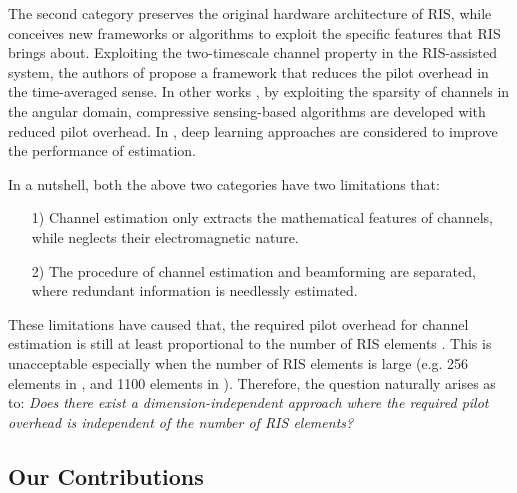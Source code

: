\documentclass[12pt,draftclsnofoot,journal,onecolumn]{IEEEtran}
\theoremstyle{nonumberplain}
\begin{document}
The second category preserves the original hardware architecture of RIS, while conceives new frameworks or algorithms to exploit the specific features that RIS brings about.
Exploiting the two-timescale channel property in the RIS-assisted system, the authors of \cite{Huchen} propose a framework that reduces the pilot overhead in the time-averaged sense.
In other works \cite{wang2020compressed,wei2021channel}, by exploiting the sparsity of channels in the angular domain, compressive sensing-based algorithms are developed with reduced pilot overhead.
In \cite{kundu2021channel}, deep learning approaches are considered to improve the performance of estimation.

In a nutshell, both the above two categories have two limitations that:
\begin{enumerate}
\item[1)]  Channel estimation only extracts the mathematical features of channels, while neglects their electromagnetic nature.
\item[2)] The procedure of channel estimation and beamforming are separated, where redundant information is needlessly estimated.
\end{enumerate}
These limitations have caused that, the required pilot overhead for channel estimation is still at least proportional to the number of RIS elements \cite{taha2021enabling,alexandropoulos2020hardware,nguyen2021hybrid,Huchen,wang2020compressed,kundu2021channel}.
This is unacceptable especially when the number of RIS elements is large (e.g. 256 elements in \cite{dai2020reconfigurable}, and 1100 elements in \cite{pei2021ris}).
Therefore, the question naturally arises as to: {\it Does there exist a dimension-independent approach where the required pilot overhead is independent of the number of RIS elements?}

\subsection{Our Contributions}
\label{Our Contributions}
\end{document}
